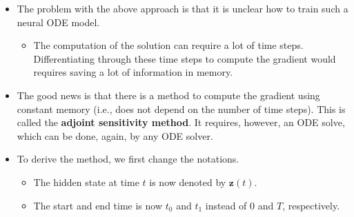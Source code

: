 \documentclass[10pt]{article}
\newcommand{\ve}[1]{\mathbf{#1}}
\begin{document}
\begin{itemize}
  \item The problem with the above approach is that it is unclear how to train such a neural ODE model.
  \begin{itemize}
    \item The computation of the solution can require a lot of time steps. Differentiating through these time steps to compute the gradient would requires saving a lot of information in memory.
  \end{itemize}

  \item The good news is that there is a method to compute the gradient using constant memory (i.e., does not depend on the number of time steps). This is called the {\bf adjoint sensitivity method}. It requires, however, an ODE solve, which can be done, again, by any ODE solver.
  
  \item To derive the method, we first change the notations.
  \begin{itemize}
    \item The hidden state at time $t$ is now denoted by $\ve{z}(t)$.
    \item The start and end time is now $t_0$ and $t_1$ instead of $0$ and $T$, respectively.
  \end{itemize}
\end{itemize}



  
\end{document}
